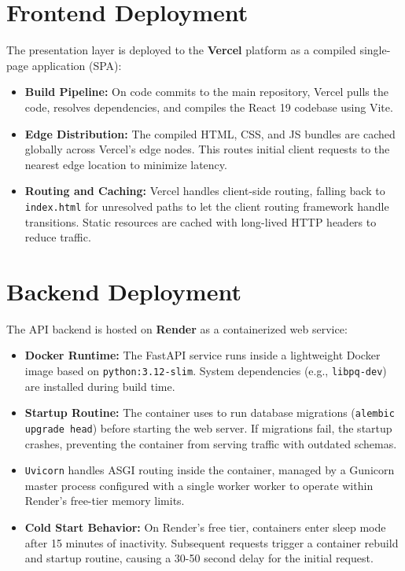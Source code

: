 \section{Frontend Deployment}
The presentation layer is deployed to the \textbf{Vercel} platform as a compiled single-page application (SPA):
\begin{itemize}
    \item \textbf{Build Pipeline:} On code commits to the main repository, Vercel pulls the code, resolves dependencies, and compiles the React 19 codebase using Vite.
    \item \textbf{Edge Distribution:} The compiled HTML, CSS, and JS bundles are cached globally across Vercel's edge nodes. This routes initial client requests to the nearest edge location to minimize latency.
    \item \textbf{Routing and Caching:} Vercel handles client-side routing, falling back to \texttt{index.html} for unresolved paths to let the client routing framework handle transitions. Static resources are cached with long-lived HTTP headers to reduce traffic.
\end{itemize}

\section{Backend Deployment}
The API backend is hosted on \textbf{Render} as a containerized web service:
\begin{itemize}
    \item \textbf{Docker Runtime:} The FastAPI service runs inside a lightweight Docker image based on \texttt{python:3.12-slim}. System dependencies (e.g., \texttt{libpq-dev}) are installed during build time.
    \item \textbf{Startup Routine:} The container uses  to run database migrations (\texttt{alembic upgrade head}) before starting the web server. If migrations fail, the startup crashes, preventing the container from serving traffic with outdated schemas.
    \item \texttt{Uvicorn} handles ASGI routing inside the container, managed by a Gunicorn master process configured with a single worker worker to operate within Render's free-tier memory limits.
    \item \textbf{Cold Start Behavior:} On Render's free tier, containers enter sleep mode after 15 minutes of inactivity. Subsequent requests trigger a container rebuild and startup routine, causing a 30-50 second delay for the initial request.
\end{itemize}

